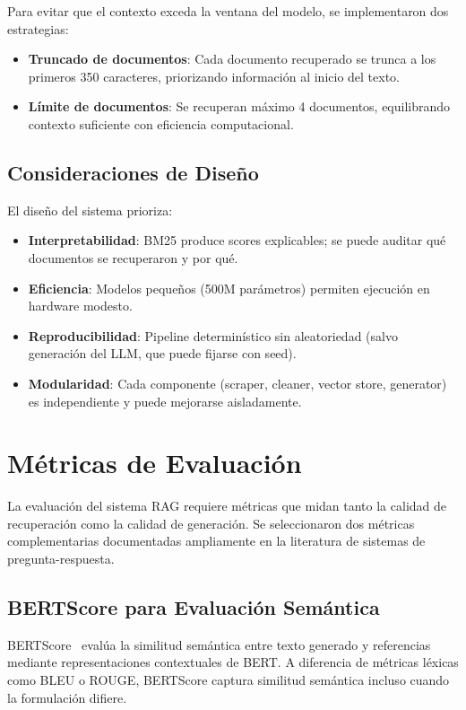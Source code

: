 Para evitar que el contexto exceda la ventana del modelo, se implementaron dos estrategias:

\begin{itemize}
    \item \textbf{Truncado de documentos}: Cada documento recuperado se trunca a los primeros 350 caracteres, priorizando información al inicio del texto.
    \item \textbf{Límite de documentos}: Se recuperan máximo 4 documentos, equilibrando contexto suficiente con eficiencia computacional.
\end{itemize}

\subsection{Consideraciones de Diseño}

El diseño del sistema prioriza:

\begin{itemize}
    \item \textbf{Interpretabilidad}: BM25 produce scores explicables; se puede auditar qué documentos se recuperaron y por qué.
    \item \textbf{Eficiencia}: Modelos pequeños (500M parámetros) permiten ejecución en hardware modesto.
    \item \textbf{Reproducibilidad}: Pipeline determinístico sin aleatoriedad (salvo generación del LLM, que puede fijarse con seed).
    \item \textbf{Modularidad}: Cada componente (scraper, cleaner, vector store, generator) es independiente y puede mejorarse aisladamente.
\end{itemize}

\section{Métricas de Evaluación}%
\label{sec:metricas}

La evaluación del sistema RAG requiere métricas que midan tanto la calidad de recuperación como la calidad de generación. Se seleccionaron dos métricas complementarias documentadas ampliamente en la literatura de sistemas de pregunta-respuesta.

\subsection{BERTScore para Evaluación Semántica}

BERTScore~\cite{zhang2019bertscore} evalúa la similitud semántica entre texto generado y referencias mediante representaciones contextuales de BERT. A diferencia de métricas léxicas como BLEU o ROUGE, BERTScore captura similitud semántica incluso cuando la formulación difiere.

